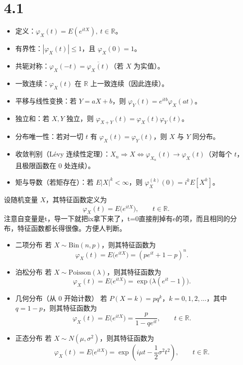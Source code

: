 \section{4.1}
\begin{itemize}
  \item 定义：$\varphi_X(t)=E(e^{itX}),\ t\in\mathbb R$。
  \item 有界性：$|\varphi_X(t)|\le 1$，且 $\varphi_X(0)=1$。
  \item 共轭对称：$\varphi_X(-t)=\overline{\varphi_X(t)}$（若 $X$ 为实值）。
  \item 一致连续：$\varphi_X(t)$ 在 $\mathbb R$ 上一致连续（因此连续）。
  \item 平移与线性变换：若 $Y=aX+b$，则 $\varphi_Y(t)=e^{itb}\varphi_X(at)$。
  \item 独立和：若 $X,Y$ 独立，则 $\varphi_{X+Y}(t)=\varphi_X(t)\varphi_Y(t)$。
  \item 分布唯一性：若对一切 $t$ 有 $\varphi_X(t)=\varphi_Y(t)$，则 $X$ 与 $Y$ 同分布。
  \item 收敛判别（L\'evy 连续性定理）：$X_n\Rightarrow X \iff \varphi_{X_n}(t)\to \varphi_X(t)$（对每个 $t$，且极限函数在 $0$ 处连续）。
  \item 矩与导数（若矩存在）：若 $E|X|^k<\infty$，则 $\varphi_X^{(k)}(0)=i^k E[X^k]$。
\end{itemize}
设随机变量 $X$，其特征函数定义为
\[
\varphi_X(t)=E\!\big(e^{itX}\big),\qquad t\in\mathbb{R}.
\]
注意自变量是t，导一下就把ix拿下来了，t=0直接削掉有e的项，而且相同的分布，特征函数都长得很像。方便人判断。
\begin{itemize}
  \item 二项分布  
  若 $X\sim \mathrm{Bin}(n,p)$，则其特征函数为
  \[
  \varphi_X(t)=E\!\big(e^{itX}\big)
  =(pe^{it}+1-p)^n.
  \]

  \item 泊松分布  
  若 $X\sim \mathrm{Poisson}(\lambda)$，则其特征函数为
  \[
  \varphi_X(t)=E\!\big(e^{itX}\big)
  =\exp\!\big(\lambda(e^{it}-1)\big).
  \]

  \item 几何分布（从 $0$ 开始计数）  
  若 $P(X=k)=p q^{k}$，$k=0,1,2,\dots$，其中 $q=1-p$，则其特征函数为
  \[
  \varphi_X(t)=E\!\big(e^{itX}\big)
  =\frac{p}{1-qe^{it}},\qquad t\in\mathbb{R}.
  \]

  \item 正态分布  
  若 $X\sim N(\mu,\sigma^2)$，则其特征函数为
  \[
  \varphi_X(t)=E\!\big(e^{itX}\big)
  =\exp\!\left(i\mu t-\frac12\sigma^2 t^2\right),\qquad t\in\mathbb{R}.
  \]
\end{itemize}

